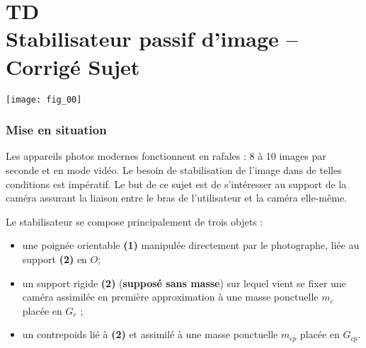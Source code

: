 \chapter*{TD  \\ 
Stabilisateur passif d'image -- \ifprof Corrigé \else Sujet \fi}

\iflivret {} \else
\ifprof  {} \else \fi
\fi

\setcounter{question}{0}
\begin{marginfigure}[4cm]
\centering
\texttt{[image: fig\_00]}
\end{marginfigure}




\subsection*{Mise en situation}
 \ifprof
 \else

Les appareils photos modernes fonctionnent en rafales : 8 à 10 images par seconde et en mode vidéo. Le besoin de
stabilisation de l’image dans de telles conditions est impératif. Le but de ce sujet est de s’intéresser au support de la caméra assurant la liaison entre le bras de l'utilisateur et la caméra elle-même.

Le stabilisateur se compose principalement de trois objets :
\begin{itemize}
\item une poignée orientable \textbf{(1)} manipulée directement par le photographe, liée au support \textbf{(2)} en $O$;
\item un support rigide \textbf{(2)} (\textbf{supposé sans masse}) sur lequel vient se fixer une caméra assimilée en première approximation à une masse ponctuelle $m_c$ placée en $G_c$ ;
\item un contrepoids lié à \textbf{(2)} et assimilé à une masse ponctuelle $m_{cp}$ placée en $G_{cp}$.
\end{itemize}

